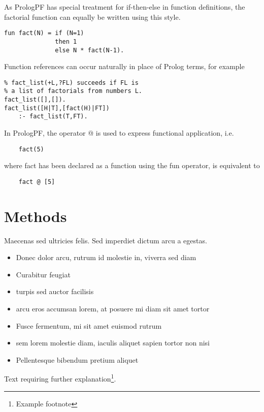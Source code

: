 \documentclass[twoside,twocolumn]{article}
\begin{document}
As PrologPF has special treatment for if-then-else in function definitions, the
factorial function can equally be written using this style.
\begin{verbatim}
fun fact(N) = if (N=1)
              then 1
              else N * fact(N-1).
\end{verbatim}

Function references can occur naturally in place of Prolog terms, for example
\begin{verbatim}
% fact_list(+L,?FL) succeeds if FL is
% a list of factorials from numbers L.
fact_list([],[]).
fact_list([H|T],[fact(H)|FT])
    :- fact_list(T,FT).
\end{verbatim}

In PrologPF, the operator @ is used to express functional application, i.e.
\begin{verbatim}
    fact(5)
\end{verbatim}
where fact has been declared as a function using the fun operator, is equivalent to
\begin{verbatim}
    fact @ [5]
\end{verbatim}


\section{Methods}

Maecenas sed ultricies felis. Sed imperdiet dictum arcu a egestas.
\begin{itemize}
\item Donec dolor arcu, rutrum id molestie in, viverra sed diam
\item Curabitur feugiat
\item turpis sed auctor facilisis
\item arcu eros accumsan lorem, at posuere mi diam sit amet tortor
\item Fusce fermentum, mi sit amet euismod rutrum
\item sem lorem molestie diam, iaculis aliquet sapien tortor non nisi
\item Pellentesque bibendum pretium aliquet
\end{itemize}
\blindtext %

Text requiring further explanation\footnote{Example footnote}.

\end{document}
